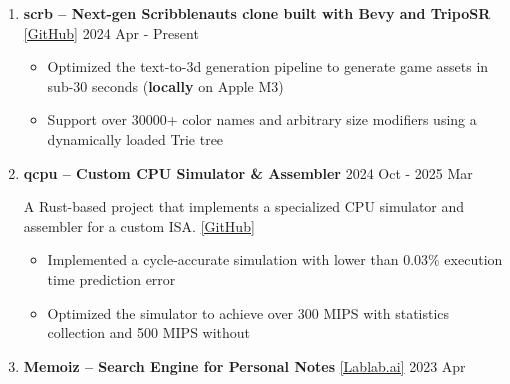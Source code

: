 \documentclass[
  a4paper,
  10pt,
  dvipdfmx
]{article}
\begin{document}
\begin{enumerate}[]
  \item \textbf{scrb -- Next-gen Scribblenauts clone built with Bevy and TripoSR} \href{https://github.com/Quatton/scrb}{[GitHub]} \hfill 2024 Apr - Present

        \begin{itemize}
          \item Optimized the text-to-3d generation pipeline to generate game assets in sub-30 seconds (\textbf{locally} on Apple M3)
          \item Support over 30000+ color names and arbitrary size modifiers using a dynamically loaded Trie tree
        \end{itemize}



  \item \textbf{qcpu -- Custom CPU Simulator \& Assembler} \hfill 2024 Oct - 2025 Mar

        A Rust-based project that implements a specialized CPU simulator and assembler for a custom ISA. \href{https://github.com/Quatton/qcpu}{[GitHub]}

        \begin{itemize}
          \item Implemented a cycle-accurate simulation with lower than 0.03\% execution time prediction error
          \item Optimized the simulator to achieve over 300 MIPS with statistics collection and 500 MIPS without
        \end{itemize}

  \item \textbf{Memoiz -- Search Engine for Personal Notes} \href{https://lablab.ai/event/ai-startup-hackathon-episode-2/we-absolutely-have-no-idea/memoiz}{[Lablab.ai]} \hfill 2023 Apr


\end{enumerate}
\end{document}
